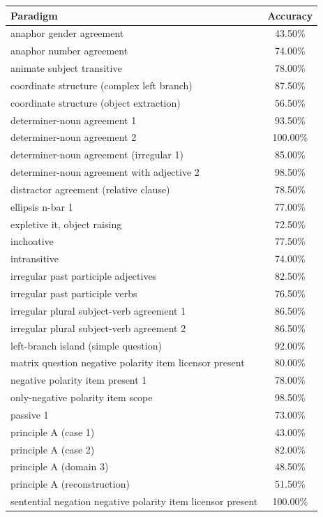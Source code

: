 \documentclass[11pt]{article}
\begin{document}
\begin{table}[h]
\centering
\begin{tabular}{@{}>{\raggedright\arraybackslash}p{9cm}c@{}}
\toprule
Paradigm & Accuracy \\
\midrule
anaphor gender agreement & 43.50\% \\
anaphor number agreement & 74.00\% \\
animate subject transitive & 78.00\% \\
coordinate structure (complex left branch) & 87.50\% \\
coordinate structure (object extraction) & 56.50\% \\
determiner-noun agreement 1 & 93.50\% \\
determiner-noun agreement 2 & 100.00\% \\
determiner-noun agreement (irregular 1) & 85.00\% \\
determiner-noun agreement with adjective 2 & 98.50\% \\
distractor agreement (relative clause) & 78.50\% \\
ellipsis n-bar 1 & 77.00\% \\
expletive it, object raising & 72.50\% \\
inchoative & 77.50\% \\
intransitive & 74.00\% \\
irregular past participle adjectives & 82.50\% \\
irregular past participle verbs & 76.50\% \\
irregular plural subject-verb agreement 1 & 86.50\% \\
irregular plural subject-verb agreement 2 & 86.50\% \\
left-branch island (simple question) & 92.00\% \\
matrix question negative polarity item licensor present & 80.00\% \\
negative polarity item present 1 & 78.00\% \\
only-negative polarity item scope & 98.50\% \\
passive 1 & 73.00\% \\
principle A (case 1) & 43.00\% \\
principle A (case 2) & 82.00\% \\
principle A (domain 3) & 48.50\% \\
principle A (reconstruction) & 51.50\% \\
sentential negation negative polarity item licensor present & 100.00\% \\

\end{tabular}
\end{table}
\end{document}
